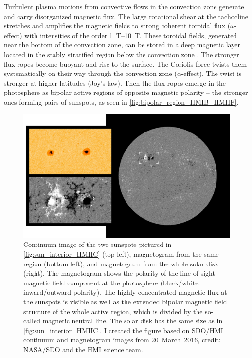 Turbulent plasma motions from convective flows in the convection zone generate and carry disorganized magnetic flux. The large rotational shear at the tachocline stretches and amplifies the magnetic fields to strong coherent toroidal flux ($\omega$-effect) with intensities of the order \SIrange{1}{10}{\tesla}. These toroidal fields, generated near the bottom of the convection zone, can be stored in a deep magnetic layer located in the stably stratified region below the convection zone \citep{Ossendrijver2003}. The stronger flux ropes become buoyant and rise to the surface. The Coriolis force twists them systematically on their way through the convection zone ($\alpha$-effect). The twist is stronger at higher latitudes (Joy's law). Then the flux ropes emerge in the photosphere as bipolar active regions of opposite magnetic polarity -- the stronger ones forming pairs of sunspots, as seen in \autoref{fig:bipolar_region_HMIB_HMIIF}.
\begin{figure}[htb]
	\centering
	\includegraphics[width=\textwidth]{figures_of_mine/schemata/bipolar_region_HMIB_HMIIF.png}
	\caption[I created the figure based on SDO/HMI continuum and magnetogram images from 20~March~2016, credit: NASA/SDO and the HMI science team.]
	{Continuum image of the two sunspots pictured in \autoref{fig:sun_interior_HMIIC} (top left), magnetogram from the same region (bottom left), and magnetogram from the whole solar disk (right). The magnetogram shows the polarity of the line-of-sight magnetic field component at the photosphere (black/white: inward/outward polarity). The highly concentrated magnetic flux at the sunspots is visible as well as the extended bipolar magnetic field structure of the whole active region, which is divided by the so-called magnetic neutral line. The solar disk has the same size as in \autoref{fig:sun_interior_HMIIC}. I created the figure based on SDO/HMI continuum and magnetogram images from 20~March~2016, credit: NASA/SDO and the HMI science team.}
	\label{fig:bipolar_region_HMIB_HMIIF}
\end{figure}
